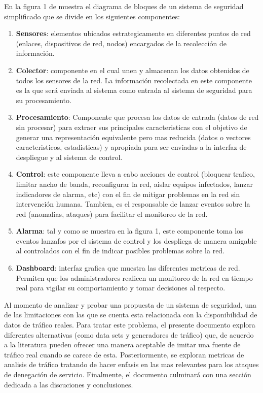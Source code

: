 \documentclass[12pt]{article}
\begin{document}
En la figura 1 de muestra el diagrama de bloques de un sistema de seguridad
simplificado que se divide en los siguientes componentes:
\begin{enumerate}
\item \textbf{Sensores}: elementos ubicados estrategicamente en diferentes puntos de red (enlaces, dispositivos de red, nodos) encargados de la recolección de información. 


\item \textbf{Colector}: componente en el cual unen y almacenan los datos obtenidos de todos los sensores de la red. La información recolectada en este componente es la que será enviada al sistema como entrada al sistema de seguridad para su procesamiento.
\item \textbf{Procesamiento}: Componente que procesa los datos de
  entrada (datos de red sin procesar) para extraer sus principales
  caracteristicas con el objetivo de generar una representación
  equivalente pero mas reducida (datos o vectores caracteristicos,
  estadisticas) y apropiada para ser enviadas a la interfaz de despliegue y al sistema de control.
\item \textbf{Control}: este componente lleva a cabo acciones de control
  (bloquear trafico, limitar ancho de banda, reconfigurar la red,
  aislar equipos infectados, lanzar indicadores de alarma, etc) con el
  fin de mitigar problemas en la red sin intervención humana. Tambien, es el responsable de lanzar eventos sobre la red (anomalias, ataques) para facilitar el monitoreo de la red.  
\item \textbf{Alarma}: tal y como se muestra en la figura 1, este
  componente toma los eventos lanzafos por el sistema de control y los despliega de manera amigable al controlados con el fin de indicar posibles problemas sobre la red. 
\item \textbf{Dashboard}: interfaz grafica que muestra las diferentes metricas de red. Permiten que los administradores realicen un monitoreo de la red en tiempo real para vigilar su comportamiento y tomar decisiones al respecto.

\end{enumerate}

Al momento de analizar y probar una propuesta de un sistema de
seguridad, una de las limitaciones con las que se cuenta esta
relacionada con la disponibilidad de datos de tráfico reales. Para
tratar este problema, el presente documento explora diferentes
alternativas (como data sets y generadores de tráfico) que, de acuerdo
a la literatura pueden ofrecer una manera aceptable de imitar una
fuente de tráfico real cuando se carece de esta. Posteriormente, se
exploran metricas de analisis de tráfico tratando de hacer enfasis en
las mas relevantes para los ataques de denegación de
servicio. Finalmente, el documento culminará con una sección dedicada
a las discuciones y conclusiones.
\end{document}
